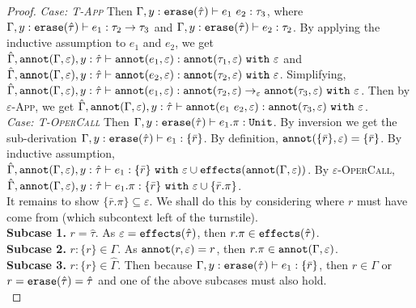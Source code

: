\begin{appendix}
\begin{proof}
\textit{Case: \textsc{T-App}} Then $\Gamma, y: \mathtt{erase}(\hat \tau) \vdash e_1~e_2: \tau_3$, where $\Gamma, y:\mathtt{erase}(\hat \tau) \vdash e_1: \tau_2 \rightarrow \tau_3$ and $\Gamma, y: \mathtt{erase}(\hat \tau) \vdash e_2: \tau_2$. By applying the inductive assumption to $e_1$ and $e_2$, we get $\hat \Gamma, \mathtt{annot}(\Gamma, \varepsilon), y: \hat \tau \vdash \mathtt{annot}(e_1, \varepsilon): \mathtt{annot}(\tau_1, \varepsilon)~\mathtt{with}~ \varepsilon$ and $\hat \Gamma, \mathtt{annot}(\Gamma, \varepsilon), y: \hat \tau \vdash \mathtt{annot}(e_2, \varepsilon): \mathtt{annot}(\tau_2, \varepsilon)~\mathtt{with}~ \varepsilon$. Simplifying, $\hat \Gamma, \mathtt{annot}(\Gamma, \varepsilon), y: \hat \tau \vdash \mathtt{annot}(e_1, \varepsilon): \mathtt{annot}(\tau_2, \varepsilon) \rightarrow_{\varepsilon} \mathtt{annot}(\tau_3, \varepsilon)~\mathtt{with}~ \varepsilon$. Then by \textsc{$\varepsilon$-App}, we get $\hat \Gamma, \mathtt{annot}(\Gamma, \varepsilon), y: \hat \tau \vdash \mathtt{annot}(e_1~e_2, \varepsilon):  \mathtt{annot}(\tau_3, \varepsilon)~\mathtt{with}~ \varepsilon$.
\\

\noindent
\textit{Case: \textsc{T-OperCall}} Then $\Gamma, y: \mathtt{erase}(\hat \tau) \vdash e_1.\pi : \mathtt{Unit}$. By inversion we get the sub-derivation $\Gamma, y: \mathtt{erase}(\hat \tau) \vdash e_1: \{ \bar r \}$. By definition, $\mathtt{annot}(\{ \bar r \}, \varepsilon) = \{ \bar r \}$. By inductive assumption, $\hat \Gamma, \mathtt{annot}(\Gamma, \varepsilon), y: \hat \tau \vdash e_1: \{ \bar r \} ~\mathtt{with}~ \varepsilon \cup \mathtt{effects}(\mathtt{annot}(\Gamma, \varepsilon))$. By \textsc{$\varepsilon$-OperCall}, $\hat \Gamma, \mathtt{annot}(\Gamma, \varepsilon), y: \hat \tau \vdash e_1.\pi: \{ \bar r \} ~\mathtt{with}~ \varepsilon \cup \{ \bar r.\pi \}$. \\

It remains to show $\{ \bar r.\pi \} \subseteq \varepsilon$. We shall do this by considering where $r$ must have come from (which subcontext left of the turnstile).  \\

\textbf{Subcase 1.} $r = \hat \tau$. As $\varepsilon = \mathtt{effects}(\hat \tau)$, then $r.\pi \in \mathtt{effects}(\hat \tau)$. \\

\textbf{Subcase 2.} $r: \{ r \} \in \Gamma$. As $\mathtt{annot}(r, \varepsilon) = r$, then $r.\pi \in \mathtt{annot}(\Gamma, \varepsilon)$. \\

\textbf{Subcase 3.} $r: \{ r \} \in \hat \Gamma$. Then because $\Gamma, y: \mathtt{erase}(\hat \tau) \vdash e_1: \{ \bar r \}$, then $r \in \Gamma$ or $r = \mathtt{erase}(\hat \tau) = \hat \tau$ and one of the above subcases must also hold. \\


\end{proof}
\end{appendix}
